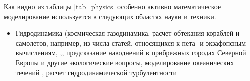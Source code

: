 Как видно из таблицы \ref{tab_physics} особенно активно математическое моделирование используется в следующих областях науки и техники.  
\begin{itemize}
	\item Гидродинамика (космическая газодинамика, расчет обтекания кораблей и самолетов, например, из числа статей, относящихся к пета- и экзафопсным вычислениям, \cite{Onishi2014},\cite{Lu2015,Peterson1989}, предсказание наводнений в прибрежных городах Северной Европы и другие экологические вопросы, моделирование океанических течений \cite{STERN20151,Newman20152086,Reuter2015325,Walker2014287}, расчет гидродинамической турбулентности\cite{Mininni2011316}%
	
\end{itemize}

